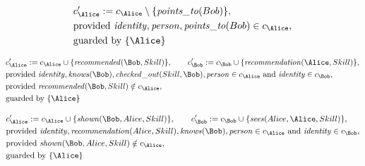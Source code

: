 \begin{align*}
&
c'_
{
\Alice
}
 := 
c_
{
\Alice
}
 \setminus 
\{
\mathit{\detokenize{
points_to
}}
(
Bob
)
\}
,\\
&
\text{provided } 
\mathit{\detokenize{
identity
}}
,
\mathit{\detokenize{
person
}}
,
\mathit{\detokenize{
points_to
}}
(
Bob
)
 \in c_
{
\Alice
}
,\\
&
\text{guarded by } \{
\Alice
\}
\end{align*}

\begin{align*}
&
c'_
{
\Alice
}
 := 
c_
{
\Alice
}
 \cup 
\{
\mathit{\detokenize{
recommended
}}
(
\Bob
,
Skill
)
\}
, \qquad 
c'_
{
\Bob
}
 := 
c_
{
\Bob
}
 \cup 
\{
\mathit{\detokenize{
recommendation
}}
(
\Alice
,
Skill
)
\}
,\\
&
\text{provided } 
\mathit{\detokenize{
identity
}}
,
\mathit{\detokenize{
knows
}}
(
\Bob
)
,
\mathit{\detokenize{
checked_out
}}
(
Skill
,
\Bob
)
,
\mathit{\detokenize{
person
}}
 \in c_
{
\Alice
}
 \text{ and } 
\mathit{\detokenize{
identity
}}
 \in c_
{
\Bob
}
,\\
&
\text{provided } 
\mathit{\detokenize{
recommended
}}
(
\Bob
,
Skill
)
 \notin c_
{
\Alice
}
,\\
&
\text{guarded by } \{
\Alice
\}
\end{align*}

\begin{align*}
&
c'_
{
\Alice
}
 := 
c_
{
\Alice
}
 \cup 
\{
\mathit{\detokenize{
shown
}}
(
\Bob
,
Alice
,
Skill
)
\}
, \qquad 
c'_
{
\Bob
}
 := 
c_
{
\Bob
}
 \cup 
\{
\mathit{\detokenize{
sees
}}
(
Alice
,
\Alice
,
Skill
)
\}
,\\
&
\text{provided } 
\mathit{\detokenize{
identity
}}
,
\mathit{\detokenize{
recommendation
}}
(
Alice
,
Skill
)
,
\mathit{\detokenize{
knows
}}
(
\Bob
)
,
\mathit{\detokenize{
person
}}
 \in c_
{
\Alice
}
 \text{ and } 
\mathit{\detokenize{
identity
}}
 \in c_
{
\Bob
}
,\\
&
\text{provided } 
\mathit{\detokenize{
shown
}}
(
\Bob
,
Alice
,
Skill
)
 \notin c_
{
\Alice
}
,\\
&
\text{guarded by } \{
\Alice
\}
\end{align*}

